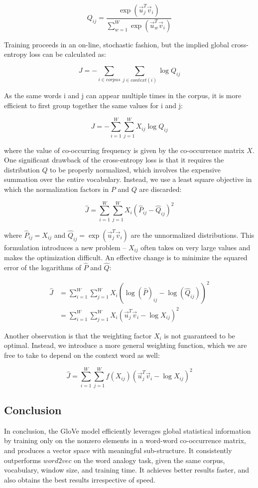 \documentclass{tufte-handout}
\begin{document}
\[
	Q_{ij} = \frac{\exp(\vec{u}_j^T \vec{v}_i)}{\sum_{w=1}^W \exp(\vec{u}_w^T \vec{v}_i)}
\]

Training proceeds in an on-line, stochastic fashion, but the implied global cross-entropy loss can be calculated as:

\[
	J = -\sum_{i \in corpus} \sum_{j \in context(i)} \log Q_{ij}
\]

As the same words i and j can appear multiple times in the corpus, it is more efficient to first group together the same values for i and j:

\[
	J = -\sum_{i=1}^W \sum_{j=1}^W X_{ij} \log Q_{ij}
\]

where the value of co-occurring frequency is given by the co-occurrence matrix $X$. One significant drawback of the cross-entropy loss is that it requires the distribution $Q$ to be properly normalized, which involves the expensive summation over the entire vocabulary. Instead, we use a least square objective in which the normalization factors in $P$ and $Q$ are discarded:

\[
	\hat{J} = \sum_{i=1}^W \sum_{j=1}^W X_i (\hat{P}_{ij} - \hat{Q}_{ij})^2
\]

where $\hat{P}_{ij} = X_{ij}$ and $\hat{Q}_{ij} = \exp(\vec{u}_j^T \vec{v}_i)$ are the unnormalized distributions. This formulation introduces a new problem -- $X_{ij}$ often takes on very large values and makes the optimization difficult. An effective change is to minimize the squared error of the logarithms of  $\hat{P}$ and $\hat{Q}$:

\begin{align*}
	\hat{J} & = \sum_{i=1}^W \sum_{j=1}^W X_i (\log(\hat{P})_{ij} - \log(\hat{Q}_{ij}))^2 \\
    & = \sum_{i=1}^W \sum_{j=1}^W X_i (\vec{u}_j^T \vec{v}_i - \log X_{ij})^2
\end{align*}

Another observation is that the weighting factor $X_i$ is not guaranteed to be optimal. Instead, we introduce a more general weighting function, which we are free to take to depend on the context word as well:

\[
	\hat{J} = \sum_{i=1}^W \sum_{j=1}^W f(X_{ij}) (\vec{u}_j^T \vec{v}_i - \log X_{ij})^2
\]

\subsection{Conclusion}
In conclusion, the GloVe model efficiently leverages global statistical information by training only on the nonzero elements in a word-word co-occurrence matrix, and produces a vector space with meaningful sub-structure. It consistently outperforms $word2vec$ on the word analogy task, given the same corpus, vocabulary, window size, and training time. It achieves better results faster, and also obtains the best results irrespective of speed.
\end{document}
